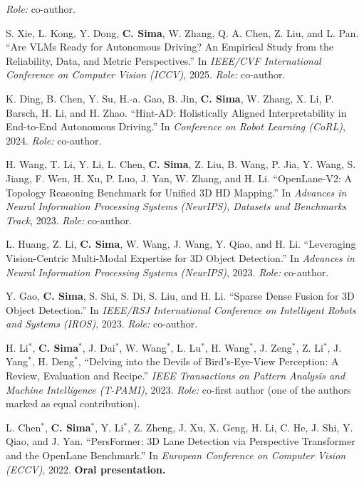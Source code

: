 \begin{enumerate}[label={[\arabic*]}, leftmargin=*, itemsep=4pt, resume]
        \emph{Role:} co-author.
  \item S. Xie, L. Kong, Y. Dong, \textbf{C. Sima}, W. Zhang, Q. A. Chen, Z. Liu, and L. Pan.
        ``Are VLMs Ready for Autonomous Driving? An Empirical Study from the Reliability, Data, and Metric Perspectives.''
        In \emph{IEEE/CVF International Conference on Computer Vision (ICCV)}, 2025.
        \emph{Role:} co-author.
  \item K. Ding, B. Chen, Y. Su, H.-a. Gao, B. Jin, \textbf{C. Sima}, W. Zhang, X. Li, P. Barsch, H. Li, and H. Zhao.
        ``Hint-AD: Holistically Aligned Interpretability in End-to-End Autonomous Driving.''
        In \emph{Conference on Robot Learning (CoRL)}, 2024.
        \emph{Role:} co-author.
  \item H. Wang, T. Li, Y. Li, L. Chen, \textbf{C. Sima}, Z. Liu, B. Wang, P. Jia, Y. Wang, S. Jiang, F. Wen, H. Xu, P. Luo, J. Yan, W. Zhang, and H. Li.
        ``OpenLane-V2: A Topology Reasoning Benchmark for Unified 3D HD Mapping.''
        In \emph{Advances in Neural Information Processing Systems (NeurIPS), Datasets and Benchmarks Track}, 2023.
        \emph{Role:} co-author.
  \item L. Huang, Z. Li, \textbf{C. Sima}, W. Wang, J. Wang, Y. Qiao, and H. Li.
        ``Leveraging Vision-Centric Multi-Modal Expertise for 3D Object Detection.''
        In \emph{Advances in Neural Information Processing Systems (NeurIPS)}, 2023.
        \emph{Role:} co-author.
  \item Y. Gao, \textbf{C. Sima}, S. Shi, S. Di, S. Liu, and H. Li.
        ``Sparse Dense Fusion for 3D Object Detection.''
        In \emph{IEEE/RSJ International Conference on Intelligent Robots and Systems (IROS)}, 2023.
        \emph{Role:} co-author.
  \item H. Li$^{*}$, \textbf{C. Sima}$^{*}$, J. Dai$^{*}$, W. Wang$^{*}$, L. Lu$^{*}$, H. Wang$^{*}$, J. Zeng$^{*}$, Z. Li$^{*}$, J. Yang$^{*}$, H. Deng$^{*}$, \etal
        ``Delving into the Devils of Bird's-Eye-View Perception: A Review, Evaluation and Recipe.''
        \emph{IEEE Transactions on Pattern Analysis and Machine Intelligence (T-PAMI)}, 2023.
        \emph{Role:} co-first author (one of the authors marked as equal contribution).
  \item L. Chen$^{*}$, \textbf{C. Sima}$^{*}$, Y. Li$^{*}$, Z. Zheng, J. Xu, X. Geng, H. Li, C. He, J. Shi, Y. Qiao, and J. Yan.
        ``PersFormer: 3D Lane Detection via Perspective Transformer and the OpenLane Benchmark.''
        In \emph{European Conference on Computer Vision (ECCV)}, 2022. \textbf{Oral presentation.}

\end{enumerate}
